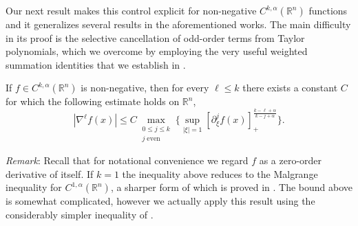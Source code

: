 \documentclass[oneside,hidelinks,indentfirst,10pt]{book}
\begin{document}
Our next result makes this control explicit for non-negative \(C^{k,\alpha}(\mathbb{R}^n)\) functions and it generalizes several results in the aforementioned works. The main difficulty in its proof is the selective cancellation of odd-order terms from Taylor polynomials, which we overcome by employing the very useful weighted summation identities that we establish in .


\begin{thm}\label{thm:cauchylike}
If \(f\in C^{k,\alpha}(\mathbb{R}^n)\) is non-negative, then for every \(\ell\leq k\) there exists a constant \(C\) for which the following estimate holds on \(\mathbb{R}^n\),
\[
    |\nabla^\ell f(x)|\leq C\max_{\substack{0\leq j\leq k\\j\;\mathrm{even}}}\bigg\{\sup_{|\xi|=1}[\partial^j_\xi f(x)]_+^\frac{k-\ell+\alpha}{k-j+\alpha}\bigg\}.
\]
\end{thm}


\textit{Remark}: Recall that for notational convenience we regard \(f\) as a zero-order derivative of itself. If \(k=1\) the inequality above reduces to the Malgrange inequality for \(C^{1,\alpha}(\mathbb{R}^n)\), a sharper form of which is proved in . The bound above is somewhat complicated, however we actually apply this result using the considerably simpler inequality of .
\end{document}

